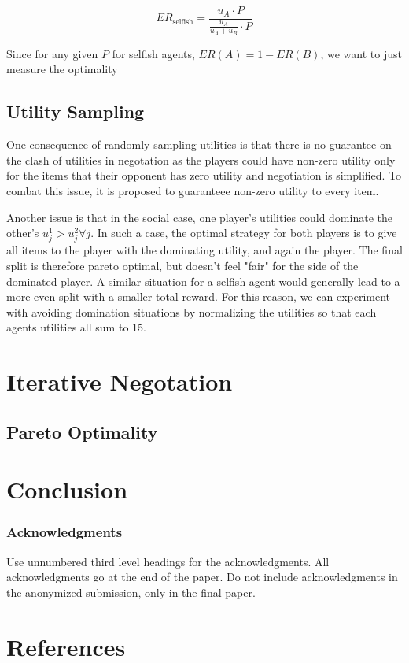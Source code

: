 \documentclass{article}
\begin{document}
\begin{equation}
    ER_{\text{selfish}} = \frac{u_A \cdot P}{\frac{u_A}{u_A + u_B} \cdot P}
\end{equation}

Since for any given $P$ for selfish agents, $ER(A) = 1 - ER(B)$, we want to just
measure the optimality


\subsection{Utility Sampling}%
\label{sub:utility_sampling}
One consequence of randomly sampling utilities is that there is no
guarantee on the clash of utilities in negotation as the players could have
non-zero utility only for the items that their opponent has zero utility and
negotiation is simplified. To combat this issue, it is proposed to guaranteee
non-zero utility to every item.

Another issue is that in the social case, one player's utilities could dominate
the other's $u_j^1 > u_j^2 \forall j$. In such a case, the optimal strategy for
both players is to give all items to the player with the dominating utility, and
again the player. The final split is therefore pareto optimal, but doesn't feel
"fair" for the side of the dominated player. A similar situation for a selfish
agent would generally lead to a more even split with a smaller total reward. For
this reason, we can experiment with avoiding domination situations by
normalizing the utilities so that each agents utilities all sum to 15.

\section{Iterative Negotation}%
\label{sec:iterative_negotation}

\subsection{Pareto Optimality}%
\label{sub:pareto_optimality}

\section{Conclusion}%
\label{sec:conclusion}

\subsubsection*{Acknowledgments}

Use unnumbered third level headings for the acknowledgments. All
acknowledgments go at the end of the paper. Do not include
acknowledgments in the anonymized submission, only in the final paper.

\section*{References}



\end{document}
